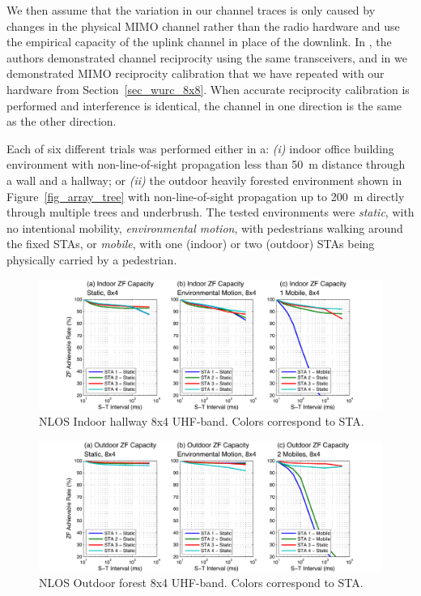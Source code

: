  We then assume that the variation in our channel traces is only caused by changes in the physical MIMO channel rather than the radio hardware and use the empirical capacity of the uplink channel in place of the downlink.
 In \cite{guillaud2013reciprocity}, the authors demonstrated channel reciprocity using the same transceivers, and in \cite{shepard2012argos} we demonstrated MIMO reciprocity calibration that we have repeated with our hardware from Section~\ref{sec_wurc_8x8}.
 When accurate reciprocity calibration is performed and interference is identical, the channel in one direction is the same as the other direction.

 Each of six different trials was performed either in a: \emph{(i)} indoor office building environment with non-line-of-sight propagation less than 50~m distance through a wall and a hallway; or \emph{(ii)} the outdoor heavily forested environment shown in Figure~\ref{fig_array_tree} with non-line-of-sight propagation up to 200~m directly through multiple trees and underbrush.
	The tested environments were \textit{static}, with no intentional mobility, \textit{environmental motion}, with pedestrians walking around the fixed \acp{STA}, or \textit{mobile}, with one (indoor) or two (outdoor) \acp{STA} being physically carried by a pedestrian.
		
\begin{figure}[p] %
\centering
\includegraphics[width=1\linewidth]{./figs/protocol/indoor_rate_loss}
\caption{NLOS Indoor hallway 8x4 UHF-band. Colors correspond to STA.}
\label{fig:indoorRateLoss}
\end{figure}

\begin{figure}[p] %
\centering
\includegraphics[width=1\linewidth]{./figs/protocol/outdoor_rate_loss}
\caption{NLOS Outdoor forest 8x4 UHF-band. Colors correspond to STA.}
\label{fig:outdoorRateLoss}
\end{figure}


